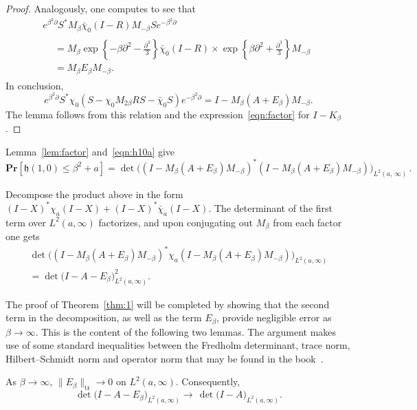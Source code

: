 \documentclass[AHL,Unicode,longabstracts]{cedram}
\DeclareMathOperator{\tr}{tr}
\newcommand{\pr}[1]{\mathbf{Pr}\left[#1\right]}
\newcommand{\h}{\mathfrak{h}}
\begin{document}
\begin{proof}
Analogously, one computes to see that
\begin{multline*}
e^{\beta^2 \partial} S^{*}M_{\beta}\bar{\chi}_0(I - R)M_{-\beta}S e^{-\beta^2 \partial} \\
\begin{aligned}
& = M_{\beta} \exp \left \{ -\beta \partial^2 - \frac{\partial^3}{3} \right \} \bar{\chi}_0 (I-R)
\times \exp \left \{ \beta \partial^2 + \frac{\partial^3}{3} \right \} M_{-\beta} \\
& = M_{\beta} E_{\beta} M_{-\beta}.
\end{aligned}
\end{multline*}
In conclusion,
\[
e^{\beta^2 \partial} S^{*}\chi_0(S- \chi_0 M_{2\beta}RS - \bar{\chi}_0 S) e^{-\beta^2 \partial} =
I - M_{\beta} (A + E_{\beta}) M_{-\beta}.
\]
The lemma follows from this relation and the expression~\eqref{eqn:factor} for $I- K_{\beta}$.
\end{proof}

Lemma~\ref{lem:factor} and~\eqref{eqn:h10a} give
\[
\pr{\h(1,0) \leq \beta^2 + a} = \det \Big((I - M_{\beta}(A+ E_{\beta})M_{-\beta})^{*}
(I - M_{\beta}(A+ E_{\beta})M_{-\beta})\Big)_{L^2(a,\, \infty)}\,.
\]
\goodbreak

Decompose the product above in the form $(I-X)^{*} \chi_a (I-X) + (I-X)^{*} \bar{\chi}_a (I-X)$. The determinant of the first term over $L^2(a, \infty)$ factorizes, and upon conjugating out $M_{\beta}$ from each factor one gets
\begin{multline}\label{eqn:h10b}
\det \Big ((I - M_{\beta}(A+ E_{\beta})M_{-\beta})^{*} \chi_a (I - M_{\beta}(A+ E_{\beta})M_{-\beta}) \Big)_{L^2(a,\infty)}\\
=\det \Big (I - A- E_{\beta}\Big)_{L^2(a,\infty)}^2.
\end{multline}

The proof of Theorem~\ref{thm:1} will be completed by showing that the second term in the decomposition, as well as the term $E_{\beta}$, provide negligible error as $\beta \to \infty$. This is the content of the following two lemmas. The argument makes use of some standard inequalities between the Fredholm determinant, trace norm, Hilbert--Schmidt norm and operator norm that may be found in the book~\cite{Simon}.

\begin{lemm} \label{lem:error1}
As $\beta \to \infty$, $\| E_{\beta}\|_{\tr} \to 0$ on $L^2(a,\infty)$. Consequently,
\[
\det \big (I - A- E_{\beta}\big)_{L^2(a,\infty)} \longrightarrow \, \det \big (I - A \big)_{L^2(a,\infty)}.
\]
\end{lemm}
\end{document}
